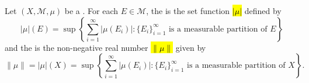 \begin{definition}
\label{definition:total_variation_measure_and_norm}
Let $(X, \mathcal{M}, \mu)$ be a . For each $E \in \mathcal{M}$, the  is the set function \hl{$|\mu|$} defined by
$$|\mu|(E) = \sup \left\{ \sum_{i=1}^{\infty} |\mu(E_i)| : \{E_i\}_{i=1}^{\infty} \text{ is a measurable partition of } E \right\}$$
and the  is the non-negative real number \hl{$\|\mu\|$} given by
$$\|\mu\| = |\mu|(X) = \sup \left\{ \sum_{i=1}^{\infty} |\mu(E_i)| : \{E_i\}_{i=1}^{\infty} \text{ is a measurable partition of } X \right\}.$$
\end{definition}
